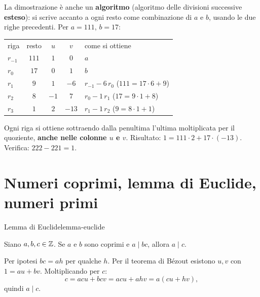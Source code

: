 \begin{spiegazione}
    La dimostrazione è anche un \textbf{algoritmo} (algoritmo delle divisioni successive \textbf{esteso}): si scrive accanto a ogni resto
    come combinazione di $a$ e $b$, usando le due righe precedenti. Per $a = 111$, $b = 17$:
    \begin{center}
    \renewcommand{\arraystretch}{1.25}
    \begin{tabular}{l|c|cc|l}
        \rowcolor{primary!12} riga & resto & $u$ & $v$ & come si ottiene \\
        $r_{-1}$ & $111$ & $1$ & $0$ & $a$ \\
        $r_0$ & $17$ & $0$ & $1$ & $b$ \\
        $r_1$ & $9$ & $1$ & $-6$ & $r_{-1} - 6\,r_0$ \quad ($111 = 17 \cdot 6 + 9$) \\
        $r_2$ & $8$ & $-1$ & $7$ & $r_0 - 1\,r_1$ \quad ($17 = 9 \cdot 1 + 8$) \\
        $r_3$ & $1$ & $2$ & $-13$ & $r_1 - 1\,r_2$ \quad ($9 = 8 \cdot 1 + 1$) \\
    \end{tabular}
    \end{center}
    Ogni riga si ottiene sottraendo dalla penultima l'ultima moltiplicata per il quoziente, \textbf{anche nelle colonne $u$ e $v$}.
    Risultato: $1 = 111 \cdot 2 + 17 \cdot (-13)$. Verifica: $222 - 221 = 1$.
\end{spiegazione}

\section{Numeri coprimi, lemma di Euclide, numeri primi}\label{sec:primi}


\begin{concetto}
\begin{Teorema}{Lemma di Euclide}{lemma-euclide}
    \begin{prerequisiti}
    \end{prerequisiti}
    Siano $a, b, c \in \mathbb{Z}$. Se $a$ e $b$ sono coprimi e $a \mid bc$, allora $a \mid c$.
\end{Teorema}
\begin{dimostrazione}
    Per ipotesi $bc = ah$ per qualche $h$. Per il teorema di Bézout esistono $u, v$ con $1 = au + bv$. Moltiplicando per $c$:
    \[ c = acu + bcv = acu + ahv = a(cu + hv), \]
    quindi $a \mid c$.
\end{dimostrazione}
\end{concetto}

